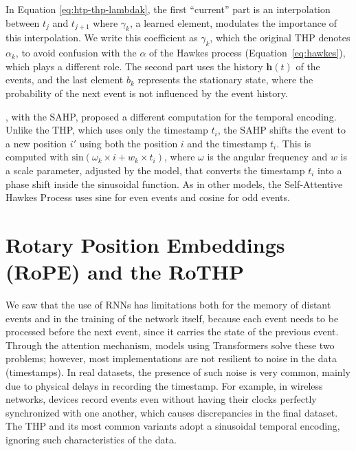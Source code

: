     In Equation \eqref{eq:htp-thp-lambdak}, the first ``current'' part is an interpolation between $t_j$ and $t_{j+1}$ where $\gamma_k$, a learned element, modulates the importance of this interpolation. We write this coefficient as $\gamma_k$, which the original THP denotes $\alpha_k$, to avoid confusion with the $\alpha$ of the Hawkes process (Equation~\eqref{eq:hawkes}), which plays a different role. The second part uses the history $\mathbf{h}(t)$ of the events, and the last element $b_k$ represents the stationary state, where the probability of the next event is not influenced by the event history.

    , with the \gls{SAHP}, proposed a different computation for the temporal encoding. Unlike the THP, which uses only the timestamp $t_i$, the SAHP shifts the event to a new position $i'$ using both the position $i$ and the timestamp $t_i$. This is computed with $\mathrm{sin}(\omega_k \times i + w_k \times t_i)$, where $\omega$ is the angular frequency and $w$ is a scale parameter, adjusted by the model, that converts the timestamp $t_i$ into a phase shift inside the sinusoidal function. As in other models, the Self-Attentive Hawkes Process uses sine for even events and cosine for odd events.

\section{Rotary Position Embeddings (RoPE) and the RoTHP}\label{sec:rothp}

    We saw that the use of RNNs has limitations both for the memory of distant events and in the training of the network itself, because each event needs to be processed before the next event, since it carries the state of the previous event. Through the attention mechanism, models using Transformers solve these two problems; however, most implementations are not resilient to noise in the data (timestamps). In real datasets, the presence of such noise is very common, mainly due to physical delays in recording the timestamp. For example, in wireless networks, devices record events even without having their clocks perfectly synchronized with one another, which causes discrepancies in the final dataset. The THP and its most common variants adopt a sinusoidal temporal encoding, ignoring such characteristics of the data.

